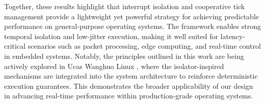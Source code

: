 \documentclass[letterpaper]{article}
\begin{document}
Together, these results highlight that interrupt isolation and cooperative tick management provide a lightweight yet powerful strategy for achieving predictable performance on general-purpose operating systems. The framework enables strong temporal isolation and low-jitter execution, making it well suited for latency-critical scenarios such as packet processing, edge computing, and real-time control in embedded systems. Notably, the principles outlined in this work are being actively explored in Ucas Wanghuo Linux \cite{zhou2025linux}, where the isolator-inspired mechanisms are integrated into the system architecture to reinforce deterministic execution guarantees. This demonstrates the broader applicability of our design in advancing real-time performance within production-grade operating systems.

\newpage
 



% 
\end{document}
